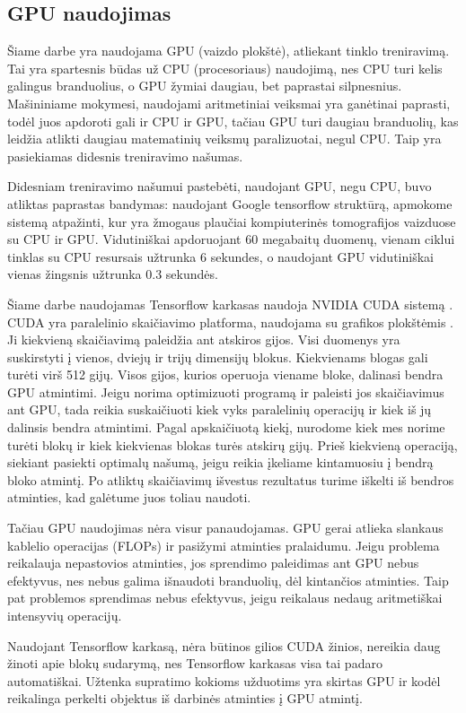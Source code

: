 \documentclass{VUMIFInfKursinis}
\begin{document}
\subsection{GPU naudojimas}
\par
Šiame darbe yra naudojama GPU (vaizdo plokštė), atliekant tinklo treniravimą. Tai yra spartesnis būdas už CPU (procesoriaus)
naudojimą, nes CPU turi kelis galingus branduolius, o GPU žymiai daugiau, bet paprastai silpnesnius. Mašininiame mokymesi,
naudojami aritmetiniai veiksmai yra ganėtinai paprasti, todėl juos apdoroti gali ir CPU ir GPU,
tačiau GPU turi daugiau branduolių, kas leidžia atlikti daugiau matematinių veiksmų paralizuotai,
negul CPU. Taip yra pasiekiamas didesnis treniravimo našumas.
\par
Didesniam treniravimo našumui pastebėti, naudojant GPU, negu CPU, buvo atliktas paprastas bandymas:
naudojant Google tensorflow struktūrą, apmokome sistemą atpažinti, kur yra žmogaus plaučiai kompiuterinės
tomografijos vaizduose su CPU ir GPU. Vidutiniškai apdoruojant 60 megabaitų duomenų, vienam ciklui
tinklas su CPU resursais užtrunka 6 sekundes, o naudojant GPU vidutiniškai vienas žingsnis užtrunka
0.3 sekundės.
\par
Šiame darbe naudojamas Tensorflow karkasas naudoja NVIDIA CUDA sistemą \cite{salt4}.
CUDA yra paralelinio skaičiavimo platforma, naudojama su grafikos plokštėmis \cite{salt5}.
Ji kiekvieną skaičiavimą paleidžia ant atskiros gijos. Visi duomenys yra suskirstyti
į vienos, dviejų ir trijų dimensijų blokus. Kiekvienams blogas gali turėti virš 512
gijų. Visos gijos, kurios operuoja viename bloke, dalinasi bendra GPU atmintimi.
Jeigu norima optimizuoti programą ir paleisti jos skaičiavimus ant GPU, tada reikia
suskaičiuoti kiek vyks paralelinių operacijų ir kiek iš jų dalinsis bendra atmintimi.
Pagal apskaičiuotą kiekį, nurodome kiek mes norime turėti blokų ir kiek kiekvienas blokas
turės atskirų gijų. Prieš kiekvieną operaciją, siekiant pasiekti optimalų našumą, jeigu
reikia įkeliame kintamuosiu į bendrą bloko atmintį. Po atliktų skaičiavimų išvestus
rezultatus turime iškelti iš bendros atminties, kad galėtume juos toliau naudoti.
\par
Tačiau GPU naudojimas nėra visur panaudojamas. GPU gerai atlieka slankaus kablelio
operacijas (FLOPs) ir pasižymi atminties pralaidumu. Jeigu problema reikalauja nepastovios atminties,
jos sprendimo paleidimas ant GPU nebus efektyvus, nes nebus galima išnaudoti branduolių,
dėl kintančios atminties. Taip pat problemos sprendimas nebus efektyvus, jeigu
reikalaus nedaug aritmetiškai intensyvių operacijų.
\par
Naudojant Tensorflow karkasą, nėra būtinos gilios CUDA žinios, nereikia daug žinoti apie blokų sudarymą, nes Tensorflow karkasas visa tai padaro automatiškai. Užtenka supratimo kokioms užduotims yra skirtas GPU ir kodėl reikalinga perkelti objektus iš darbinės atminties į GPU atmintį.
\end{document}
